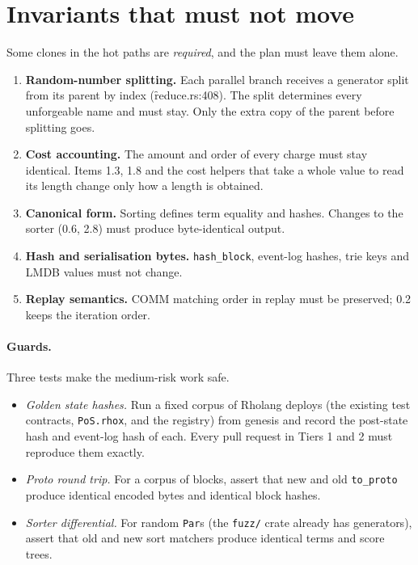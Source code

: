 \documentclass[11pt]{article}
\begin{document}
\section{Invariants that must not move}
\label{sec:guard}

Some clones in the hot paths are \emph{required}, and the plan must leave them alone.

\begin{enumerate}
\item \textbf{Random-number splitting.} Each parallel branch receives a generator split from its
parent by index (\f{reduce.rs}:408). The split determines every unforgeable name and must stay.
Only the extra copy of the parent before splitting goes.
\item \textbf{Cost accounting.} The amount and order of every charge must stay identical. Items
1.3, 1.8 and the cost helpers that take a whole value to read its length change only how a length
is obtained.
\item \textbf{Canonical form.} Sorting defines term equality and hashes. Changes to the sorter
(0.6, 2.8) must produce byte-identical output.
\item \textbf{Hash and serialisation bytes.} \texttt{hash\_block}, event-log hashes, trie keys and
LMDB values must not change.
\item \textbf{Replay semantics.} COMM matching order in replay must be preserved; 0.2 keeps the
iteration order.
\end{enumerate}

\paragraph{Guards.} Three tests make the medium-risk work safe.
\begin{itemize}
\item \emph{Golden state hashes.} Run a fixed corpus of Rholang deploys (the existing test
contracts, \texttt{PoS.rhox}, and the registry) from genesis and record the post-state hash and
event-log hash of each. Every pull request in Tiers 1 and 2 must reproduce them exactly.
\item \emph{Proto round trip.} For a corpus of blocks, assert that new and old
\texttt{to\_proto} produce identical encoded bytes and identical block hashes.
\item \emph{Sorter differential.} For random \texttt{Par}s (the \texttt{fuzz/} crate already has
generators), assert that old and new sort matchers produce identical terms and score trees.
\end{itemize}
\end{document}
